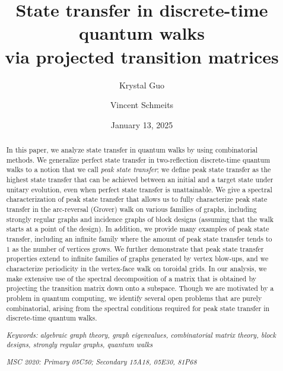 \documentclass{article}
\title{State transfer in discrete-time quantum walks \\ via projected transition matrices}
\author{Krystal Guo \and Vincent Schmeits }
\date{January 13, 2025}
\numberwithin{equation}{section}
\begin{document}
\maketitle

\begingroup
    \renewcommand\thefootnote{}
\endgroup
\begin{abstract}

In this paper, we analyze state transfer in quantum walks by using combinatorial methods. We generalize perfect state transfer in two-reflection discrete-time quantum walks to a notion that we call \textsl{peak state transfer};  we define peak state transfer as the highest state transfer that can be achieved between an initial and a target state under unitary evolution, even when perfect state transfer is unattainable. We give a spectral characterization of peak state transfer that allows us to fully characterize peak state transfer in the arc-reversal (Grover) walk on various families of graphs, including strongly regular graphs and incidence graphs of block designs (assuming that the walk starts at a point of the design). In addition,  we  provide many examples of peak state transfer, including an infinite family where the amount of peak state transfer tends to $1$ as the number of vertices grows. We further demonstrate that peak state transfer properties extend to infinite families of graphs generated by vertex blow-ups, and we characterize periodicity in the vertex-face walk on toroidal grids. In our analysis, we make extensive use of the spectral decomposition of a matrix that is obtained by projecting the transition matrix down onto a subspace. Though we are motivated by a problem in quantum computing, we identify several open problems that are purely combinatorial, arising from the spectral conditions required for peak state transfer in discrete-time quantum walks.


  \noindent\textit{Keywords: algebraic graph theory, graph eigenvalues, combinatorial matrix theory,  block designs, strongly regular graphs, quantum walks} 

 
  \noindent\textit{MSC 2020: Primary 05C50; Secondary 15A18, 05E30,  81P68 } 
\end{abstract}
\end{document}
